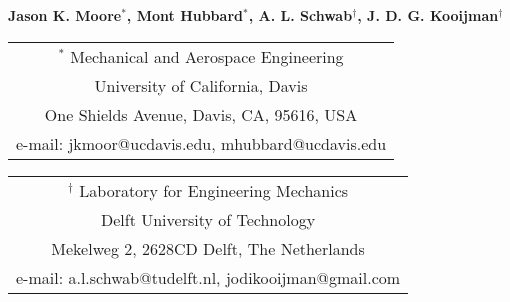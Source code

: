 \documentclass{bmd2010p}
\begin{document}
\begin{center}
\end{center}

\begin{center}
\normalsize{\bf{Jason K. Moore$^{*}$, Mont Hubbard$^{*}$, A. L. Schwab$^\dag$,
            J. D. G. Kooijman$^\dag$}}
\end{center}

\begin{center}
\begin{tabular}{c}
$^*$ Mechanical and Aerospace Engineering\\
University of California, Davis\\
One Shields Avenue, Davis, CA, 95616, USA\\
e-mail: jkmoor@ucdavis.edu, mhubbard@ucdavis.edu\\
\end{tabular}
\begin{tabular}{c}
$^\dag$ Laboratory for Engineering Mechanics\\
Delft University of Technology\\
Mekelweg 2, 2628CD Delft, The Netherlands\\
e-mail: a.l.schwab@tudelft.nl, jodikooijman@gmail.com\\
\end{tabular} \\ \vspace{2.5ex}

\end{center}
\end{document}
